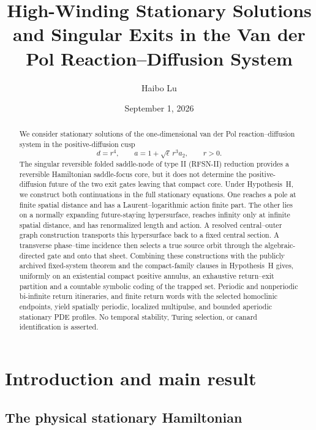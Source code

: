 \documentclass[11pt,reqno]{amsart}
\title[High-winding stationary solutions]{High-Winding Stationary Solutions and Singular Exits in the Van der Pol Reaction--Diffusion System}
\author{Haibo Lu}
\date{September 1, 2026}
\numberwithin{equation}{section}
\theoremstyle{definition}
\theoremstyle{remark}
\begin{document}
\begin{abstract}
We consider stationary solutions of the one-dimensional van der Pol
reaction--diffusion system in the positive-diffusion cusp
\[
 d=r^4,\qquad a=1+\sqrt\epsilon\,r^3a_2,\qquad r>0.
\]
The singular reversible folded saddle-node of type II (RFSN-II) reduction
provides a reversible Hamiltonian saddle-focus core, but it does not determine
the positive-diffusion future of the two exit gates leaving that compact core.
Under Hypothesis~H, we
construct both continuations in the full stationary equations.  One reaches a
pole at finite spatial distance and has a Laurent--logarithmic action finite
part.  The other lies on a normally expanding future-staying hypersurface,
reaches infinity only at infinite spatial distance, and has renormalized
length and action.  A resolved central--outer graph construction transports
this hypersurface back to a fixed central section.  A transverse phase--time
incidence then selects a true source orbit through the algebraic-directed gate
and onto that sheet.  Combining these constructions
with the publicly archived fixed-system theorem and the compact-family clauses
in Hypothesis~H gives, uniformly on an existential compact positive annulus,
an exhaustive return--exit partition and a countable symbolic coding of the
trapped set.  Periodic and nonperiodic
bi-infinite return itineraries, and finite return words with the selected
homoclinic endpoints, yield spatially periodic, localized multipulse, and
bounded aperiodic stationary PDE profiles.  No temporal stability, Turing
selection, or canard identification is asserted.
\end{abstract}

\maketitle

\section{Introduction and main result}\label{sec:intro}

\subsection{The physical stationary Hamiltonian}
\end{document}
